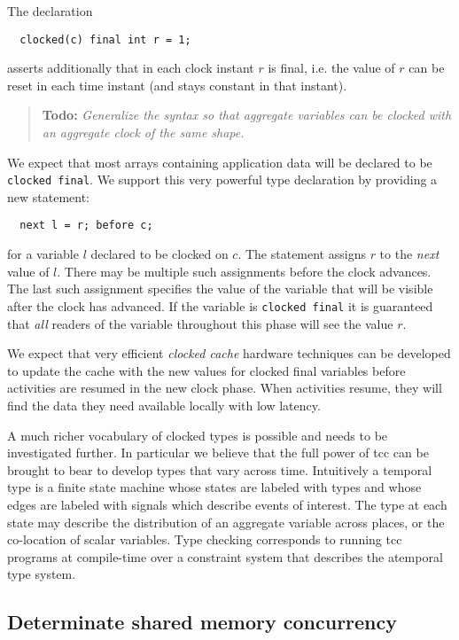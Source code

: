 \documentclass{article}
\def\ccfont{\sf}
\def\tcc{{\ccfont tcc}}
\newcommand \todo[1] {\begin{quotation}{\bf Todo:} {\footnotesize\em #1}\end{quotation}}
\begin{document}
{The declaration 

{\footnotesize
\begin{verbatim}
  clocked(c) final int r = 1;
\end{verbatim}}

\noindent asserts additionally that in each clock instant $r$ is final, 
i.e.{} the value of $r$ can be reset in each time instant (and stays
constant in that instant). 

\todo{Generalize the syntax so that aggregate variables can be clocked with an aggregate clock of the same shape.}

We expect that most arrays containing application data will be
declared to be {\tt clocked final}. We support this very powerful type
declaration by providing a new statement:
{\footnotesize
\begin{verbatim}
  next l = r; before c;
\end{verbatim}}

\noindent 
for a variable $l$ declared to be clocked on $c$. The statement
assigns $r$ to the {\em next} value of $l$. There may be multiple such
assignments before the clock advances. The last such assignment
specifies the value of the variable that will be visible after the
clock has advanced.  If the variable is {\tt clocked final} it is
guaranteed that {\em all} readers of the variable throughout this
phase will see the value $r$.

We expect that very efficient {\em clocked cache} hardware techniques
can be developed to update the cache with the new values for clocked
final variables before activities are resumed in the new clock phase.
When activities resume, they will find the data they need available
locally with low latency.

A much richer vocabulary of clocked types is possible and needs to be
investigated further. In particular we believe that the full power of
\tcc{} can be brought to bear to develop types that vary across time. 
Intuitively a temporal type is a finite state machine whose states are
labeled with types and whose edges are labeled with signals which
describe events of interest. The type at each state may describe the
distribution of an aggregate variable across places, or the
co-location of scalar variables. Type checking corresponds to running
\tcc{} programs at compile-time over a constraint system that describes the atemporal type system.

\subsection{Determinate shared memory concurrency}

}
\end{document}
